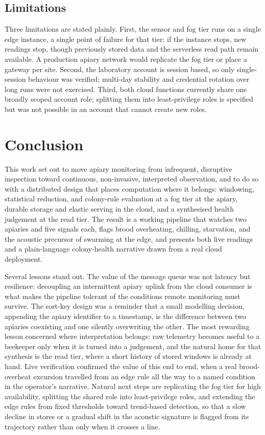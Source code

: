 \documentclass[conference]{IEEEtran}
\begin{document}
\subsection{Limitations}

Three limitations are stated plainly. First, the sensor and fog tier runs on a single edge instance, a single point of failure for that tier: if the instance stops, new readings stop, though previously stored data and the serverless read path remain available. A production apiary network would replicate the fog tier or place a gateway per site. Second, the laboratory account is session based, so only single-session behaviour was verified; multi-day stability and credential rotation over long runs were not exercised. Third, both cloud functions currently share one broadly scoped account role; splitting them into least-privilege roles is specified but was not possible in an account that cannot create new roles.

\section{Conclusion}

This work set out to move apiary monitoring from infrequent, disruptive inspection toward continuous, non-invasive, interpreted observation, and to do so with a distributed design that places computation where it belongs: windowing, statistical reduction, and colony-rule evaluation at a fog tier at the apiary, durable storage and elastic serving in the cloud, and a synthesised health judgement at the read tier. The result is a working pipeline that watches two apiaries and five signals each, flags brood overheating, chilling, starvation, and the acoustic precursor of swarming at the edge, and presents both live readings and a plain-language colony-health narrative drawn from a real cloud deployment.

Several lessons stand out. The value of the message queue was not latency but resilience: decoupling an intermittent apiary uplink from the cloud consumer is what makes the pipeline tolerant of the conditions remote monitoring must survive. The sort-key design was a reminder that a small modelling decision, appending the apiary identifier to a timestamp, is the difference between two apiaries coexisting and one silently overwriting the other. The most rewarding lesson concerned where interpretation belongs: raw telemetry becomes useful to a beekeeper only when it is turned into a judgement, and the natural home for that synthesis is the read tier, where a short history of stored windows is already at hand. Live verification confirmed the value of this end to end, when a real brood-overheat excursion travelled from an edge rule all the way to a named condition in the operator's narrative. Natural next steps are replicating the fog tier for high availability, splitting the shared role into least-privilege roles, and extending the edge rules from fixed thresholds toward trend-based detection, so that a slow decline in stores or a gradual shift in the acoustic signature is flagged from its trajectory rather than only when it crosses a line.



\end{document}
